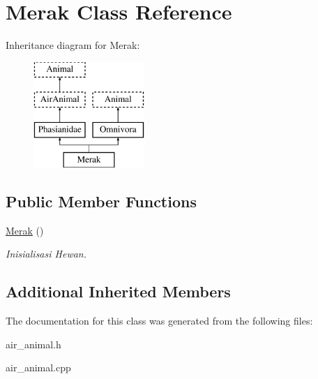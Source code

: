 \hypertarget{class_merak}{}\section{Merak Class Reference}
\label{class_merak}
Inheritance diagram for Merak\+:\begin{figure}[H]
\begin{center}
\leavevmode
\includegraphics[height=4.000000cm]{class_merak}
\end{center}
\end{figure}
\subsection*{Public Member Functions}
\begin{DoxyCompactItemize}
\item 
\hyperlink{class_merak_abc8e0d235b1fadd0e522f2e8f84677e6}{Merak} ()\hypertarget{class_merak_abc8e0d235b1fadd0e522f2e8f84677e6}{}\label{class_merak_abc8e0d235b1fadd0e522f2e8f84677e6}

\begin{DoxyCompactList}\small\item\em Inisialisasi Hewan. \end{DoxyCompactList}\end{DoxyCompactItemize}
\subsection*{Additional Inherited Members}


The documentation for this class was generated from the following files\+:\begin{DoxyCompactItemize}
\item 
air\+\_\+animal.\+h\item 
air\+\_\+animal.\+cpp\end{DoxyCompactItemize}
